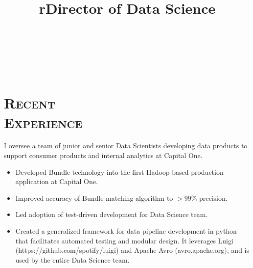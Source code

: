 \begin{resume}







\begin{formatb}
  \title{r}\\
  \\
  \body\\
\end{formatb}

\section{\textsc{Recent \\ Experience}}

\title{Director of Data Science}
\begin{position}
I oversee a team of junior and senior Data Scientists developing data products to support consumer products and internal analytics at Capital One.  
\begin{itemize}
\item Developed Bundle technology into the first Hadoop-based production application at Capital One.
\item Improved accuracy of Bundle matching algorithm to \begin{math} > 99 \% \end{math} precision.
\item Led adoption of test-driven development for Data Science team.
\item Created a generalized framework for data pipeline development in python that facilitates automated testing and modular design.  It leverages Luigi (https://github.com/spotify/luigi) and Apache Avro (avro.apache.org), and is used by the entire Data Science team.
\end{itemize}
\end{position}


\end{resume}

